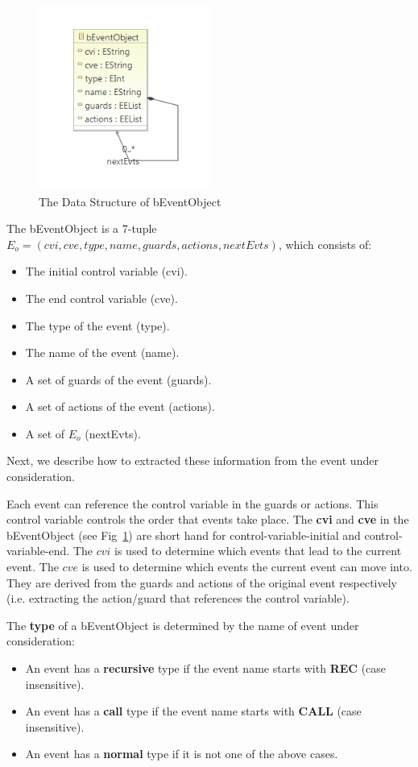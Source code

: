 \documentclass{easychair}
\begin{document}
\begin{figure}[!h]
  \centering
    \includegraphics[width=0.5\textwidth]{img/ebo.PNG}
  \caption{The Data Structure of bEventObject}
  \label{fig:ebo}
\end{figure}

The bEventObject is a 7-tuple $E_o = (cvi, cve, type, name, guards, actions, nextEvts)$, which consists of:
\begin{itemize}
	\item The initial control variable (cvi).
	\item The end control variable (cve).
	\item The type of the event (type).
	\item The name of the event (name).
	\item A set of guards of the event (guards).
	\item A set of actions of the event (actions).
	\item A set of $E_o$ (nextEvts). 
\end{itemize}
Next, we describe how to extracted these information from the event under consideration.

Each event can reference the control variable in the guards or actions. This control variable controls the order that events take place. The \textbf{cvi} and \textbf{cve} in the bEventObject (see Fig~\ref{fig:ebo}) are short hand for control-variable-initial and control-variable-end. The $cvi$ is used to determine which events that lead to the current event. The $cve$ is used to determine which events the current event can move into. They are derived from the guards and actions of the original event respectively (i.e. extracting the action/guard that references the control variable).

The \textbf{type} of a bEventObject is determined by the name of event under consideration:
\begin{itemize}
	\item An event has a \textbf{recursive} type if the event name starts with \textbf{REC} (case insensitive).
	\item An event has a \textbf{call} type if the event name starts with \textbf{CALL} (case insensitive).
	\item An event has a \textbf{normal} type if it is not one of the above cases.
\end{itemize}
\end{document}
